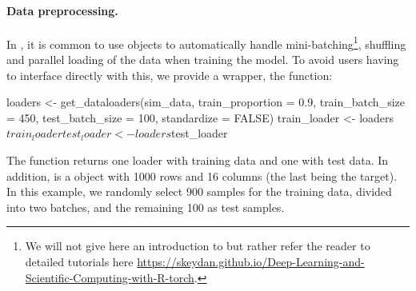 \paragraph{Data preprocessing.} In , it is common to use  objects to automatically handle mini-batching\footnote{We will not give here an introduction to  but rather refer the reader to detailed tutorials here \url{https://skeydan.github.io/Deep-Learning-and-Scientific-Computing-with-R-torch}.}, shuffling and parallel loading of the data when training the model. To avoid users having to interface directly with this, we provide a wrapper, the  function:
\begin{example}
loaders <- get_dataloaders(sim_data, train_proportion = 0.9,
                           train_batch_size = 450, test_batch_size = 100,
                           standardize = FALSE)
train_loader <- loaders$train_loader
test_loader  <- loaders$test_loader
\end{example}
The function returns one loader with training data and one with test data. In addition,  is a  object with 1000 rows and 16 columns (the last being the target). In this example, we randomly select 900 samples for the training data, divided into two batches, and the remaining 100 as test samples. 

